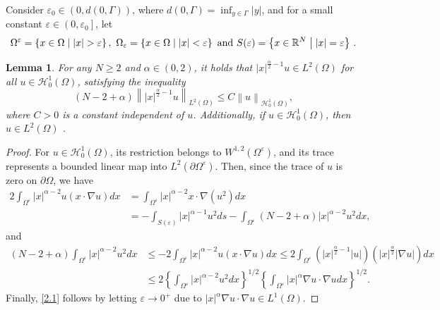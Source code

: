 \documentclass[11pt]{article}
\newtheorem{lemma}{Lemma}[section]
\numberwithin{equation}{section}
\def\Om{\Omega}
\def\mcH{\mathcal{H}}
\begin{document}
 Consider  $\varepsilon _0\in (0, d(0,\Gamma))$,  where
 $d(0,\Gamma)=\inf_{y\in \Gamma} |y|$,  and for a small constant $\varepsilon \in \left( 0,\varepsilon _0\right] $, let
		\begin{equation*}
			\Om^\varepsilon  = \left\lbrace x\in \Om \mid |x|>\varepsilon  \right\rbrace, \ \Om_\varepsilon  = \left\lbrace x\in \Om \mid |x|<\varepsilon  \right\rbrace \mbox{ and } S(\varepsilon ) = \left\lbrace x\in \mathbb{R}^N \bigm| |x|=\varepsilon  \right\rbrace\,.
		\end{equation*}
		\begin{lemma}\label{L2.2}
			For any $N\ge 2$ and $\alpha\in (0,2)$, it holds that  $|x|^{\frac{\alpha}{2}-1}  u  \in L^2(\Om)$ for all $ u \in \mcH_0^1(\Om)$, satisfying the inequality
			\begin{equation}\label{2.1}
				(N-2+\alpha) \left\| |x|^{\frac{\alpha}{2}-1}   u  \right\| _{L^2(\Om)} \le C\left\|  u  \right\| _{\mcH_0^1(\Om)},
			\end{equation}
			where $C>0$ is a constant independent of   $ u$.  Additionally, if $ u \in \mathcal{H}_0^1(\Om)$,
			then $ u \in L^2(\Om)$ .
		\end{lemma}
		\begin{proof} 		
			For $ u  \in \mcH_0^1(\Om)$,  its restriction belongs to $W^{1,2}\left(\Om^{\varepsilon }\right)$,
			and its trace represents a bounded linear map into  $L^2\left(\partial \Om^{\varepsilon }\right)$. Then,
since the trace of $ u $ is zero on $\partial \Omega$, we have
			$$
			\begin{aligned}
				2 \int_{\Om^{\varepsilon }} |x|^{\alpha-2}   u (x \cdot \nabla  u ) d x & =\int_{\Om^{\varepsilon }} |x|^{\alpha-2}  x \cdot \nabla\left( u ^2\right) d x \\
				& =-\int_{S(\varepsilon )} |x|^{\alpha-1}   u ^2 d s-\int_{\Om^{\varepsilon }}(N-2+\alpha) |x|^{\alpha-2}   u ^2 d x,
			\end{aligned}
			$$
			 and
			$$
			\begin{aligned}
				(N-2+\alpha) \int_{\Om^{\varepsilon }} |x|^{\alpha-2}   u ^2 d x & \le-2 \int_{\Om^{\varepsilon }} |x|^{\alpha-2}   u (x \cdot \nabla  u ) d x \le 2 \int_{\Om^{\varepsilon }}\left(|x|^{\frac{\alpha}{2}-1}  | u |\right)\left(|x|^{\frac{\alpha}{2}}|\nabla  u |\right) d x \\
				& \le 2\left\{\int_{\Om^{\varepsilon }} |x|^{\alpha-2}  u ^2 d x\right\}^{1 / 2}\left\{\int_{\Om^{\varepsilon }} |x|^\alpha   \nabla  u  \cdot \nabla  u   d x\right\}^{1 / 2}.
			\end{aligned}
			$$
			Finally, \eqref{2.1} follows by letting $\varepsilon  \rightarrow 0^+$ due to  $|x|^\alpha \nabla  u \cdot\nabla  u  \in L^1(\Omega)$.
		\end{proof}		
		
\end{document}
